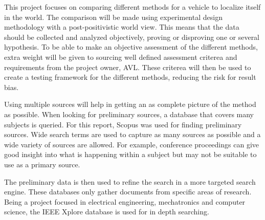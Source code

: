 This project focuses on comparing different methods for a vehicle to localize
itself in the world. The comparison will be made using experimental design
methodology with a post-positivistic world view. This means that the data should
be collected and analyzed objectively, proving or disproving one or several
hypothesis. To be able to make an objective assessment of the different methods,
extra weight will be given to sourcing well defined assessment criterea and
requirements from the project owner, AVL. These criterea will then be used to
create a testing framework for the different methods, reducing the risk for
result bias.

Using multiple sources will help in getting an as complete picture of the method
as possible. When looking for preliminary sources, a database that covers many
subjects is queried. For this report, Scopus was used for finding preliminary
sources. Wide search terms are used to capture as many sources as possible and a
wide variety of sources are allowed. For example, conference proceedings can
give good insight into what is happening within a subject but may not be
suitable to use as a primary source. 

The preliminary data is then used to refine the search in a more targeted search
engine. These databases only gather documents from specific areas of research.
Being a project focused in electrical engineering, mechatronics and computer
science, the IEEE Xplore database is used for in depth searching.  

